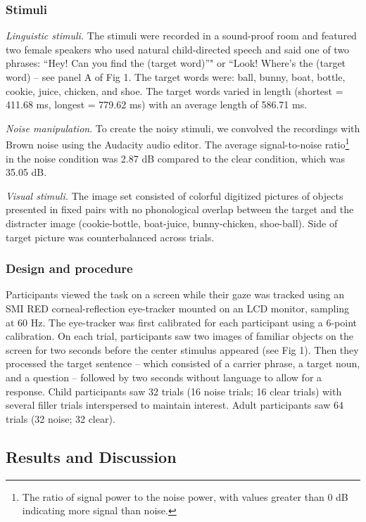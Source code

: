 \documentclass[10pt, letterpaper]{article}
\begin{document}
\subsubsection{Stimuli}\label{stimuli}

\emph{Linguistic stimuli.} The stimuli were recorded in a sound-proof
room and featured two female speakers who used natural child-directed
speech and said one of two phrases: ``Hey! Can you find the (target
word)''" or ``Look! Where's the (target word) -- see panel A of Fig 1.
The target words were: ball, bunny, boat, bottle, cookie, juice,
chicken, and shoe. The target words varied in length (shortest = 411.68
ms, longest = 779.62 ms) with an average length of 586.71 ms.

\emph{Noise manipulation}. To create the noisy stimuli, we convolved the
recordings with Brown noise using the Audacity audio editor. The average
signal-to-noise ratio\footnote{The ratio of signal power to the noise
  power, with values greater than 0 dB indicating more signal than
  noise.} in the noise condition was 2.87 dB compared to the clear
condition, which was 35.05 dB.

\emph{Visual stimuli.} The image set consisted of colorful digitized
pictures of objects presented in fixed pairs with no phonological
overlap between the target and the distracter image (cookie-bottle,
boat-juice, bunny-chicken, shoe-ball). Side of target picture was
counterbalanced across trials.

\subsubsection{Design and procedure}\label{design-and-procedure}

Participants viewed the task on a screen while their gaze was tracked
using an SMI RED corneal-reflection eye-tracker mounted on an LCD
monitor, sampling at 60 Hz. The eye-tracker was first calibrated for
each participant using a 6-point calibration. On each trial,
participants saw two images of familiar objects on the screen for two
seconds before the center stimulus appeared (see Fig 1). Then they
processed the target sentence -- which consisted of a carrier phrase, a
target noun, and a question -- followed by two seconds without language
to allow for a response. Child participants saw 32 trials (16 noise
trials; 16 clear trials) with several filler trials interspersed to
maintain interest. Adult participants saw 64 trials (32 noise; 32
clear).

\subsection{Results and Discussion}\label{results-and-discussion}
\end{document}
